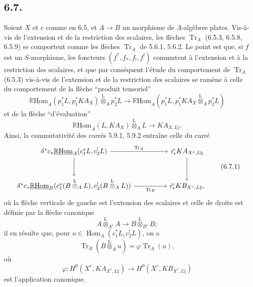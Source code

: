 \documentclass[11pt]{article}
\DeclareMathOperator{\Hom}{Hom}
\newcommand{\R}{\mathbb{R}}\newcommand{\RHomCore}{\mathbb{R}\mathrm{Hom}}
\providecommand{\RHom}{\RHomCore}
\providecommand{\uRHom}{\underline{\RHom}}
\providecommand{\Tr}{\operatorname{Tr}}
\providecommand{\Tr}{\operatorname{Tr}}
\providecommand{\lten}{\overset{\mathrm L}{\otimes}}
\providecommand{\Tr}{\operatorname{Tr}}
\providecommand{\RHom}{\RHomCore}
\providecommand{\Hom}{\operatorname{Hom}}
\providecommand{\lten}{\overset{\mathrm L}{\otimes}}
\providecommand{\RHom}{\R\mathcal{H}om}
\providecommand{\lten}{\overset{\mathrm L}{\otimes}}
\providecommand{\R}{\mathrm R}
\providecommand{\Tr}{\operatorname{Tr}}
\providecommand{\lten}{\overset{\mathrm L}{\otimes}}
\providecommand{\lten}{\overset{\mathrm L}{\otimes}}
\providecommand{\lten}{\overset{\mathrm L}{\otimes}}
\providecommand{\RHom}{\RHomCore}
\providecommand{\Hom}{\operatorname{Hom}}
\providecommand{\Tr}{\operatorname{Tr}}
\providecommand{\lten}{\overset{\mathrm L}{\otimes}}
\begin{document}
\subsection*{6.7.}
Soient $X$ et $c$ comme en 6.5, et $A\to B$ un morphisme de $\Lambda$-algèbres plates. Vis-à-vis de l'extension et de la restriction des scalaires, les flèches $\Tr_A$ (6.5.3, 6.5.8, 6.5.9) se comportent comme les flèches $\Tr_A$ de 5.6.1, 5.6.2. Le point est que, si $f$ est un $S$-morphisme, les foncteurs $(f^*,f_*,f_!,f^!)$ commutent à l'extension et à la restriction des scalaires, et que par conséquent l'étude du comportement de $\Tr_A$ (6.5.3) vis-à-vis de l'extension et de la restriction des scalaires se ramène à celle du comportement de la flèche ``produit tensoriel''
\[
\uRHom_A(p_1^*L,p_1^*KA_X)\lten_Ap_2^*L
\longrightarrow
\uRHom_A(p_1^*L,p_1^*KA_X\lten_Ap_2^*L)
\]
et de la flèche ``d'évaluation''
\[
\uRHom_A(L,KA_X)\lten_A L\longrightarrow KA_{X,L\natural}.
\]
Ainsi, la commutativité des carrés 5.9.1, 5.9.2 entraîne celle du carré
\begin{equation}
\begin{tikzcd}[column sep=huge,row sep=large]
\delta^*c_*\uRHom_A(c_1^*L,c_2^!L) \arrow[r,"\Tr_A"] \arrow[d]
& i_*^cKA_{X^c,L\natural} \arrow[d]\\
\delta^*c_*\uRHom_B(c_1^*(B\lten_A L),c_2^!(B\lten_A L)) \arrow[r,"\Tr_B"']
& i_*^cKB_{X^c,L\natural},
\end{tikzcd}
\tag{6.7.1}
\end{equation}
où la flèche verticale de gauche est l'extension des scalaires et celle de droite est définie par la flèche canonique
\[
A\lten_{A^e}A\longrightarrow B\lten_{B^e}B;
\]
il en résulte que, pour $u\in\Hom_A(c_1^*L,c_2^!L)$, on a
\begin{equation}
\Tr_B(B\lten_Au)=\varphi\Tr_A(u),
\tag{6.7.2}
\end{equation}
où
\[
\varphi:H^0(X^c,KA_{X^c,L\natural})\longrightarrow H^0(X^c,KB_{X^c,L\natural})
\]
est l'application canonique.
\end{document}

